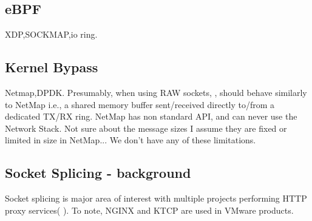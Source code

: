 \subsection{eBPF}
XDP,SOCKMAP,io ring.
\subsection{Kernel Bypass}
Netmap,DPDK.
Presumably, when using RAW sockets, \oursys, should behave similarly to NetMap i.e., a shared memory buffer sent/received directly to/from a dedicated TX/RX ring.
NetMap has non standard API, and can never use the Network Stack. Not sure about the message sizes I assume they are fixed or limited in size in NetMap...
We don't have any of these limitations.

\subsection{Socket Splicing - background}
Socket splicing is major area of interest with multiple projects performing HTTP proxy services( \cite{squid,HAProxy,varnish,nginx,ktcp}). To note, NGINX\cite{nginx} and KTCP\cite{ktcp} are used in VMware products.


